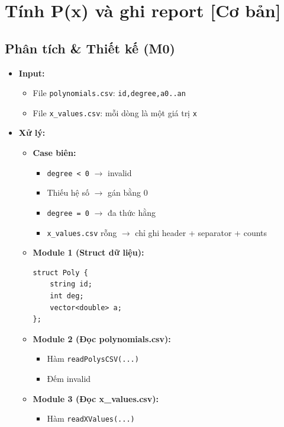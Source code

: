 \section{Tính P(x) và ghi report [Cơ bản]}
\subsection{Phân tích \& Thiết kế (M0)}
\begin{itemize}
    \item \textbf{Input:}
    \begin{itemize}
        \item File \texttt{polynomials.csv}: \texttt{id,degree,a0..an}
        \item File \texttt{x\_values.csv}: mỗi dòng là một giá trị \texttt{x}
    \end{itemize}

    \item \textbf{Xử lý:}
    \begin{itemize}
        \item \textbf{Case biên:}
        \begin{itemize}
            \item \texttt{degree < 0} $\rightarrow$ invalid
            \item Thiếu hệ số $\rightarrow$ gán bằng 0
            \item \texttt{degree = 0} $\rightarrow$ đa thức hằng
            \item \texttt{x\_values.csv} rỗng $\rightarrow$ chỉ ghi header + separator + counts
        \end{itemize}

        \item \textbf{Module 1 (Struct dữ liệu):}
\begin{lstlisting}
struct Poly {
    string id;
    int deg;
    vector<double> a;
};
\end{lstlisting}

        \item \textbf{Module 2 (Đọc polynomials.csv):}
        \begin{itemize}
            \item Hàm \texttt{readPolysCSV(...)}
            \item Đếm invalid
        \end{itemize}

        \item \textbf{Module 3 (Đọc x\_values.csv):}
        \begin{itemize}
            \item Hàm \texttt{readXValues(...)}
        \end{itemize}


\end{itemize}
\end{itemize}

